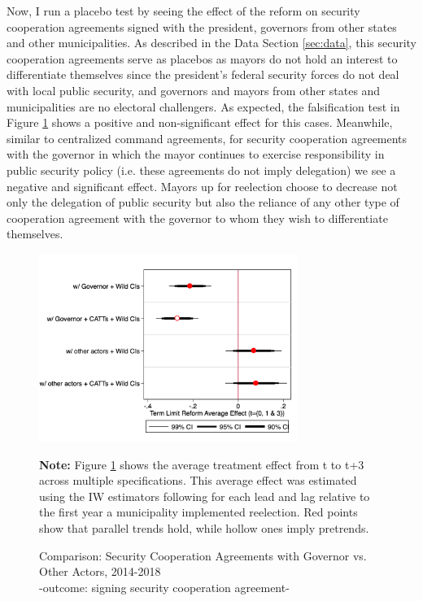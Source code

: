 \documentclass[12pt]{amsart}
\numberwithin{equation}{section}
\theoremstyle{definition}
\theoremstyle{definition}
\theoremstyle{definition}
\begin{document}
Now, I run a placebo test by seeing the effect of the reform on security cooperation agreements signed with the president, governors from other states and other municipalities. As described in the Data Section \ref{sec:data}, this security cooperation agreements serve as placebos as mayors do not hold an interest to differentiate themselves since the president's federal security forces do not deal with local public security, and governors and mayors from other states and municipalities are no electoral challengers. As expected,  the falsification test in Figure \ref{fig:comparison_fed_estatal} shows a positive and non-significant effect for this cases. Meanwhile, similar to centralized command agreements, for security cooperation agreements with the governor in which the mayor continues to exercise responsibility in public security policy (i.e. these agreements do not imply delegation) we see a negative and significant effect. Mayors up for reelection choose to decrease not only the delegation of public security but also the reliance of any other type of cooperation agreement with the governor to whom they wish to differentiate themselves.    
  
 \begin{figure}[h]   
\centering
 \caption{Comparison: Security Cooperation Agreements with Governor vs. Other Actors, 2014-2018 \\ -outcome: signing security cooperation agreement-}
 \label{fig:comparison_fed_estatal}
\includegraphics[width=0.75\textwidth]{Figures/average_effects_comparisonfedest.png}
       \captionsetup{justification=centering}
       
 \textbf{Note:} Figure \ref{fig:comparison_fed_estatal} shows the average treatment effect from t to t+3 across multiple specifications. This average effect was estimated using the IW estimators following \citet{abraham_sun_2020} for each lead and lag relative to the first year a municipality implemented reelection. Red points show that parallel trends hold, while hollow ones imply pretrends. 
\end{figure}   
\end{document}
